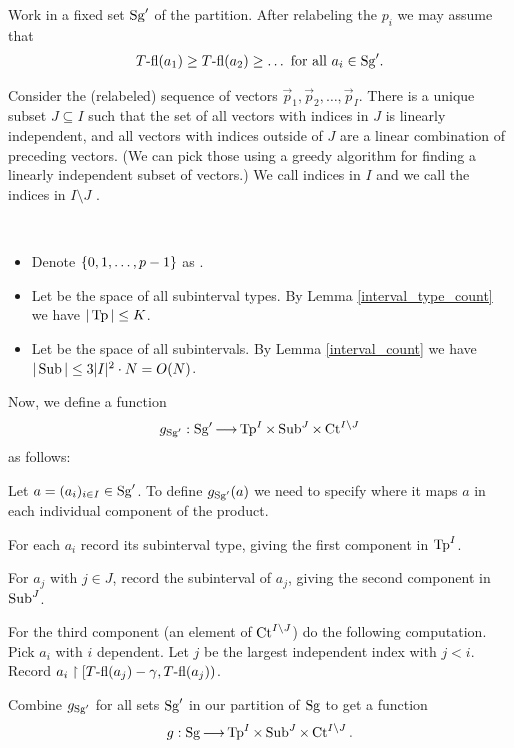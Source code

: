 \documentclass{amsart}
\begin{document}
Work in a fixed set $\operatorname{Sg}'$ of the partition.
After relabeling the $p_i$ we may assume that
\begin{align*}
  T{\operatorname{-fl}}(a_1) \geq T{\operatorname{-fl}}(a_2) \geq \ldots \text { for all $a_i \in \operatorname{Sg}'$}.
\end{align*}

Consider the (relabeled) sequence of vectors $\vec p_1, \vec p_2, \ldots, \vec p_I$.
There is a unique subset $J \subseteq I$ such that the set of all vectors with indices in $J$ is linearly independent,
and all vectors with indices outside of $J$ are a linear combination of preceding vectors.
(We can pick those using a greedy algorithm for finding a linearly independent subset of vectors.)
We call indices in $I$  and we call the indices in $I \setminus J$ .


\begin{Definition} \ 
  \begin{itemize}
  \item Denote $\left\{0,1, \ldots, p-1\right\}$ as .
  \item Let  be the space of all subinterval types.
    By Lemma \ref{interval_type_count} we have $|\operatorname{Tp}| \leq K$.
  \item Let  be the space of all subintervals.
    By Lemma \ref{interval_count} we have $|\operatorname{Sub}| \leq 3 |I|^2 \cdot N = O(N)$.
  \end{itemize}
\end{Definition}

\begin{Definition}
  Now, we define a function
  \begin{align*}
    g_{\operatorname{Sg}'}: \operatorname{Sg}' \operatorname{\longrightarrow} \operatorname{Tp}^I \times \operatorname{Sub}^J \times \operatorname{Ct}^{I \backslash J}
  \end{align*}
  as follows:
  
  Let $a = (a_i)_{i\in I} \in \operatorname{Sg}'$.
  To define $g_{\operatorname{Sg}'}(a)$ we need to specify where it maps $a$ in each individual component of the product.

  For each $a_i$ record its subinterval type, giving the first component in $\operatorname{Tp}^I$.

  For $a_j$ with $j \in J$, record the subinterval of $a_j$, giving the second component in $\operatorname{Sub}^J$.

  For the third component (an element of $\operatorname{Ct}^{I \backslash J}$) do the following computation.
  Pick $a_i$ with $i$ dependent.
  Let $j$ be the largest independent index with $j < i$.
  Record $a_i \upharpoonright [T{\operatorname{-fl}}(a_j) - \gamma, T{\operatorname{-fl}}(a_j))$.

  Combine $g_{\operatorname{Sg}'}$ for all sets $\operatorname{Sg}'$ in our partition of $\operatorname{Sg}$ to get a function 
  \begin{align*}
    g: \operatorname{Sg} \operatorname{\longrightarrow} \operatorname{Tp}^I \times \operatorname{Sub}^J \times \operatorname{Ct}^{I \backslash J}.  
  \end{align*}
\end{Definition}
\end{document}

